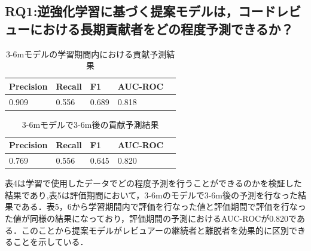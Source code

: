 \documentclass[submit,techrep,noauthor]{ipsj}
\begin{document}
\subsection{RQ1:逆強化学習に基づく提案モデルは，コードレビューにおける長期貢献者をどの程度予測できるか？}

\begin{table}[h]
    \centering
    \caption{3-6mモデルの学習期間内における貢献予測結果}
    \begin{tabularx}{\columnwidth}{XXXXX}
        \hline
       Precision & Recall & F1 & AUC-ROC \\
       \hline
       0.909  & 0.556 & 0.689 & 0.818 \\ 
       \hline
    \end{tabularx}
\end{table}

\begin{table}[h]
    \centering
    \caption{3-6mモデルで3-6m後の貢献予測結果}
    \begin{tabularx}{\columnwidth}{XXXXX}
        \hline
       Precision & Recall & F1 & AUC-ROC \\
       \hline
       0.769  & 0.556 & 0.645 & 0.820 \\ 
       \hline
    \end{tabularx}
\end{table}

表4は学習で使用したデータでどの程度予測を行うことができるのかを検証した結果であり,表5は評価期間において，3-6mのモデルで3-6m後の予測を行なった結果である．表5，6から学習期間内で評価を行なった値と評価期間で評価を行なった値が同様の結果になっており，評価期間の予測におけるAUC-ROCが0.820である．このことから提案モデルがレビュアーの継続者と離脱者を効果的に区別できることを示している．
\end{document}

